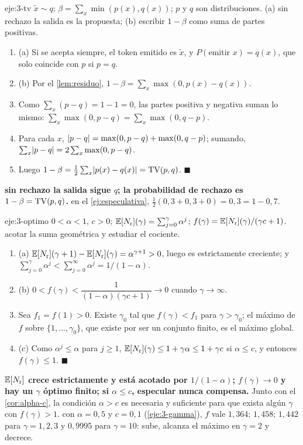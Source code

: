 \begin{solucion}{eje:3-tv}
\datos $\tilde x\sim q$; $\beta=\sum_x\min(p(x),q(x))$; $p$ y $q$ son distribuciones.
\planteamiento (a) sin rechazo la salida es la propuesta; (b) escribir $1-\beta$ como suma de partes positivas.
\pasos
\begin{enumerate}[label=\arabic*.]
  \item (a) Si se acepta siempre, el token emitido es $\tilde x$, y $P(\text{emitir }x)=q(x)$, que solo coincide con $p$ si $p=q$.
  \item (b) Por el \cref{lem:residuo}, $1-\beta=\sum_x\max(0,p(x)-q(x))$.
  \item Como $\sum_x(p-q)=1-1=0$, las partes positiva y negativa suman lo mismo: $\sum_x\max(0,p-q)=\sum_x\max(0,q-p)$.
  \item Para cada $x$, $\lvert p-q\rvert=\max(0,p-q)+\max(0,q-p)$; sumando, $\sum_x\lvert p-q\rvert=2\sum_x\max(0,p-q)$.
  \item Luego $1-\beta=\frac12\sum_x\lvert p(x)-q(x)\rvert=\operatorname{TV}(p,q)$. \hfill$\blacksquare$
\end{enumerate}
\resultado \textbf{sin rechazo la salida sigue $q$; la probabilidad de rechazo es $1-\beta=\operatorname{TV}(p,q)$.}
\comprobacion en el \cref{ej:especulativa}, $\frac12(0{,}3+0{,}3+0)=0{,}3=1-0{,}7$.
\end{solucion}

\begin{solucion}{eje:3-optimo}
\datos $0<\alpha<1$, $c>0$; $\mathbb{E}[N_{\mathrm{r}}](\gamma)=\sum_{j=0}^{\gamma}\alpha^{j}$; $f(\gamma)=\mathbb{E}[N_{\mathrm{r}}](\gamma)/(\gamma c+1)$.
\planteamiento acotar la suma geométrica y estudiar el cociente.
\pasos
\begin{enumerate}[label=\arabic*.]
  \item (a) $\mathbb{E}[N_{\mathrm{r}}](\gamma+1)-\mathbb{E}[N_{\mathrm{r}}](\gamma)=\alpha^{\gamma+1}>0$, luego es estrictamente creciente; y $\sum_{j=0}^{\gamma}\alpha^{j}<\sum_{j=0}^{\infty}\alpha^{j}=1/(1-\alpha)$.
  \item (b) $0<f(\gamma)<\dfrac{1}{(1-\alpha)(\gamma c+1)}\to 0$ cuando $\gamma\to\infty$.
  \item Sea $f_1=f(1)>0$. Existe $\gamma_0$ tal que $f(\gamma)<f_1$ para $\gamma>\gamma_0$; el máximo de $f$ sobre $\{1,\dots,\gamma_0\}$, que existe por ser un conjunto finito, es el máximo global.
  \item (c) Como $\alpha^{j}\le\alpha$ para $j\ge 1$, $\mathbb{E}[N_{\mathrm{r}}](\gamma)\le 1+\gamma\alpha\le 1+\gamma c$ si $\alpha\le c$, y entonces $f(\gamma)\le 1$. \hfill$\blacksquare$
\end{enumerate}
\resultado \textbf{$\mathbb{E}[N_{\mathrm{r}}]$ crece estrictamente y está acotado por $1/(1-\alpha)$; $f(\gamma)\to 0$ y hay un $\gamma$ óptimo finito; si $\alpha\le c$, especular nunca compensa.} Junto con el \cref{cor:alpha-c}, la condición $\alpha>c$ es necesaria y suficiente para que exista algún $\gamma$ con $f(\gamma)>1$.
\comprobacion con $\alpha=0{,}5$ y $c=0{,}1$ (\cref{eje:3-gamma}), $f$ vale $1{,}364$; $1{,}458$; $1{,}442$ para $\gamma=1,2,3$ y $0{,}9995$ para $\gamma=10$: sube, alcanza el máximo en $\gamma=2$ y decrece.
\end{solucion}

